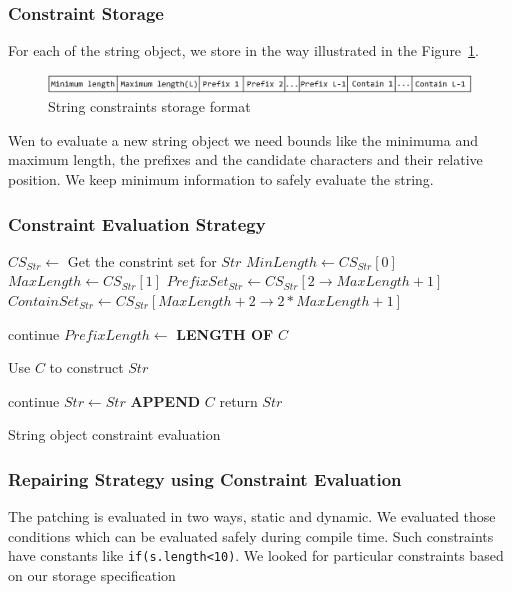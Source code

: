 \subsubsection{Constraint Storage}
\label{subsubsec:constraintStorage}

For each of the string object, we store in the way illustrated in the
Figure~\ref{fig:constraint}.

\begin{figure}[htb]
\centering
\includegraphics[scale=.5]{images/constraint.eps}
\caption{String constraints storage format}
\label{fig:constraint}
\end{figure}

Wen to evaluate a new string object we need bounds like the minimuma and maximum
length, the prefixes and the candidate characters and their relative position.
We keep minimum information to safely evaluate the string.

\subsubsection{Constraint Evaluation Strategy}
\label{subsubsec:constraintStorage}

\begin{algorithm}
\DontPrintSemicolon
{}
\Begin
{
 $CS_{Str} \longleftarrow$ Get the constrint set for $Str$\;
 $MinLength \longleftarrow CS_{Str}[0]$\;
 $MaxLength \longleftarrow CS_{Str}[1]$\;
 $PrefixSet_{Str} \longleftarrow CS_{Str}[2 \rightarrow MaxLength + 1]$\;
 $ContainSet_{Str} \longleftarrow CS_{Str}[MaxLength +2  \rightarrow 2*MaxLength
 + 1]$\;
 
  {
   {
    continue\;
   }
   $PrefixLength \longleftarrow$ {\bf LENGTH OF} $C$\;
   
   {
     Use $C$ to construct $Str$\;
   }
  }
 
  {
   {
    continue\;
   }
   $Str \leftarrow Str$ {\bf APPEND} $C$\;
  }
  return $Str$\;
}
\caption{String object constraint evaluation}
 \label{algo:constraint}
\end{algorithm}

\subsubsection{Repairing Strategy using Constraint Evaluation}
\label{subsubsec:repairingStrategyConstraint}

The patching is evaluated in two ways, static and dynamic. We evaluated those
conditions which can be evaluated safely during compile time. Such constraints
have constants like \texttt{if(s.length<10)}. We looked for particular
constraints based on our storage specification 
